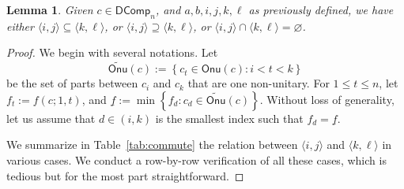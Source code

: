 \documentclass[reqno]{amsart}
\numberwithin{equation}{section}
\newtheorem{lemma}[theorem]{Lemma}
\theoremstyle{definition}
\theoremstyle{named}
\newcommand{\set}[1]{\left\{#1\right\}}
\def\DComp{\mathsf{DComp}}
\def\Onu{\mathsf{Onu}}
\def\tonu{\widetilde{\Onu}}
\def\uf{\underline{f}}
\begin{document}
\begin{lemma}\label{lemma-interval}
Given $c\in \DComp_n$, and $a,b,i,j,k,\ell$ as previously defined, we have either $\langle i,j\rangle \subseteq \langle k,\ell\rangle$, or $\langle i,j\rangle \supseteq \langle k,\ell\rangle$, or $\langle i,j\rangle \cap \langle k,\ell\rangle=\varnothing$.
\end{lemma}
\begin{proof}
We begin with several notations. Let
$$\tonu(c):=\set{c_t\in\Onu(c):i<t<k}$$ be the set of parts between $c_i$ and $c_k$ that are one non-unitary. For $1\le t\le n$, let $f_t:=f(c;1,t)$, and $\uf:=\min\set{f_d: c_d\in \tonu(c)}$. Without loss of generality, let us assume that $d\in (i,k)$ is the smallest index such that $f_d=\uf$.


We summarize in Table~\ref{tab:commute} the relation between $\langle i,j\rangle$ and $\langle k,\ell\rangle$ in various cases. We conduct a row-by-row verification of all these cases, which is tedious but for the most part straightforward. 	


\end{proof}
\end{document}
